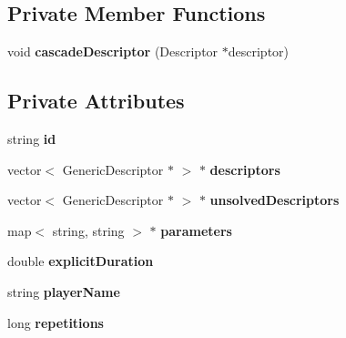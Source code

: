 \subsection*{Private Member Functions}
\begin{CompactItemize}
\item 
void \textbf{cascadeDescriptor} (Descriptor $\ast$descriptor)\label{classbr_1_1pucrio_1_1telemidia_1_1ginga_1_1ncl_1_1model_1_1presentation_1_1CascadingDescriptor_22c053317d984ce5fe15afdd95aa5f4c}

\end{CompactItemize}
\subsection*{Private Attributes}
\begin{CompactItemize}
\item 
string {\bf id}\label{classbr_1_1pucrio_1_1telemidia_1_1ginga_1_1ncl_1_1model_1_1presentation_1_1CascadingDescriptor_d97b05b88ce9080f35b157cfacc8eb69}

\item 
vector$<$ GenericDescriptor $\ast$ $>$ $\ast$ {\bf descriptors}\label{classbr_1_1pucrio_1_1telemidia_1_1ginga_1_1ncl_1_1model_1_1presentation_1_1CascadingDescriptor_5be8b56566cd3f353cb2f1f4a438fd17}

\item 
vector$<$ GenericDescriptor $\ast$ $>$ $\ast$ {\bf unsolvedDescriptors}\label{classbr_1_1pucrio_1_1telemidia_1_1ginga_1_1ncl_1_1model_1_1presentation_1_1CascadingDescriptor_6cf55a6e4b10cf286d557457ceba456d}

\item 
map$<$ string, string $>$ $\ast$ {\bf parameters}\label{classbr_1_1pucrio_1_1telemidia_1_1ginga_1_1ncl_1_1model_1_1presentation_1_1CascadingDescriptor_1e28602d5e217941878c6ba0353a05d5}

\item 
double {\bf explicitDuration}\label{classbr_1_1pucrio_1_1telemidia_1_1ginga_1_1ncl_1_1model_1_1presentation_1_1CascadingDescriptor_25ec408d682588fe94840beec9f41971}

\item 
string {\bf playerName}\label{classbr_1_1pucrio_1_1telemidia_1_1ginga_1_1ncl_1_1model_1_1presentation_1_1CascadingDescriptor_10874314fe395811ac20c09f50847241}

\item 
long {\bf repetitions}\label{classbr_1_1pucrio_1_1telemidia_1_1ginga_1_1ncl_1_1model_1_1presentation_1_1CascadingDescriptor_854b086d24df592a5cb60cdaa01c54a0}


\end{CompactItemize}
